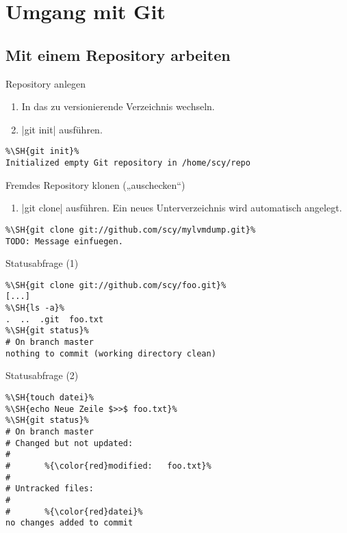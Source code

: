 \section{Umgang mit Git}

\subsection{Mit einem Repository arbeiten}

\begin{frame}[fragile=singleslide]{Repository anlegen}
\begin{enumerate}
	\item In das zu versionierende Verzeichnis wechseln.
	\item \TYPE|git init| ausführen.
\end{enumerate}
\begin{example}
\begin{lstlisting}
%\SH{git init}%
Initialized empty Git repository in /home/scy/repo
\end{lstlisting}
\end{example}
\end{frame}

\begin{frame}[fragile=singleslide]{Fremdes Repository klonen („auschecken“)}
\begin{enumerate}
	\item \TYPE|git clone| ausführen. Ein neues Unterverzeichnis wird automatisch angelegt.
\end{enumerate}
\begin{example}
\begin{lstlisting}
%\SH{git clone git://github.com/scy/mylvmdump.git}%
TODO: Message einfuegen.
\end{lstlisting}
\end{example}
\end{frame}

\begin{frame}[fragile=singleslide]{Statusabfrage (1)}
\begin{example}
\begin{lstlisting}
%\SH{git clone git://github.com/scy/foo.git}%
[...]
%\SH{ls -a}%
.  ..  .git  foo.txt
%\SH{git status}%
# On branch master
nothing to commit (working directory clean)
\end{lstlisting}
\end{example}
\end{frame}

\begin{frame}[fragile=singleslide]{Statusabfrage (2)}
\begin{example}
\begin{lstlisting}
%\SH{touch datei}%
%\SH{echo Neue Zeile $>>$ foo.txt}%
%\SH{git status}%
# On branch master
# Changed but not updated:
#
#       %{\color{red}modified:   foo.txt}%
#
# Untracked files:
#
#       %{\color{red}datei}%
no changes added to commit
\end{lstlisting}
\end{example}
\end{frame}

